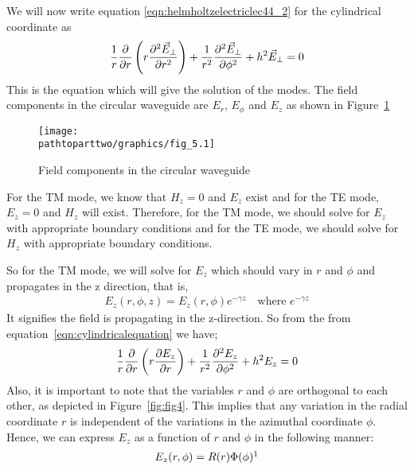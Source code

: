 We will now write equation \ref{eqn:helmholtzelectriclec44_2} for the cylindrical coordinate as 
\begin{align}
\frac{1}{r}\partialderivative{}{r}\left(r\partialderivative[2]{\vec{E}_\bot}{r}\right) + \frac{1}{r^2}\partialderivative[2]{\vec{E}_\bot}{\phi}+ h^2\vec{E}_\bot = 0 
\label{eqn:cylindricalequation}   
\end{align}
This is the equation which will give the solution of the modes. The field components in the circular waveguide are $E_r$, $E_\phi$ and $E_z$ as shown in Figure~\ref{fig:fig5}
\begin{figure}[h]
\centering
\texttt{[image: \\pathtoparttwo/graphics/fig\_5.1]}
\caption{Field components in the circular waveguide}
\label{fig:fig5}
\end{figure}

For the TM mode, we know that $H_z=0$ and $E_z$ exist and for the TE mode, $E_z=0$ and $H_z$ will exist. Therefore, for the TM mode, we should solve for $E_z$ with appropriate boundary conditions and for the TE mode, we should solve for $H_z$ with appropriate boundary conditions. 

So for the TM mode, we will solve for $E_z$ which should vary in $r$ and $\phi$ and propagates in the z direction, that is,
\begin{align*}
E_z(r,\phi, z)=E_z(r,\phi)e^{-\gamma z}\quad\text{where }e^{-\gamma z}
\end{align*}
It signifies the field is propagating in the z-direction. So from the from equation~\eqref{eqn:cylindricalequation} we have;
\begin{equation}
\frac{1}{r}\partialderivative{}{r}\left(r\partialderivative{E_z}{r}\right) + \frac{1}{r^2}\partialderivative[2]{E_z}{\phi} + h^2 E_z = 0 
\label{eqn:pdecircularwaveguide}
\end{equation}
Also, it is important to note that the variables $r$ and $\phi$ are orthogonal to each other, as depicted in Figure~\ref{fig:fig4}. This implies that any variation in the radial coordinate $r$ is independent of the variations in the azimuthal coordinate $\phi$. Hence, we can express $E_z$ as a function of $r$ and $\phi$ in the following manner:
\begin{align*}
E_z(r, \phi) = R(r)\Phi(\phi)\footnotemark
\end{align*}

